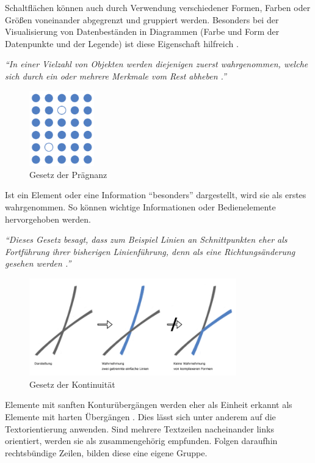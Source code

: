 Schaltflächen können auch durch Verwendung verschiedener Formen, Farben oder Größen voneinander abgegrenzt und gruppiert werden. Besonders bei der Visualisierung von Datenbeständen in Diagrammen (Farbe und Form der Datenpunkte und der Legende) ist diese Eigenschaft hilfreich \cite[S. 187]{Moser2012}.\par
{}
\textit{\enquote{In einer Vielzahl von Objekten werden diejenigen zuerst wahrgenommen, welche sich durch ein oder mehrere Merkmale vom Rest abheben \cite[S. 187]{Moser2012}.}}\par
\begin{figure}[H]
 \centering
 \includegraphics[width=0.25\textwidth]{grafiken/praegnanz.png}
 \caption{Gesetz der Prägnanz}
 \label{fig:gesetzPraeg}
\end{figure}
Ist ein Element oder eine Information \enquote{besonders} dargestellt, wird sie als erstes wahrgenommen. So können wichtige Informationen oder Bedienelemente hervorgehoben werden.\par
{}
\textit{\enquote{Dieses Gesetz besagt, dass zum Beispiel Linien an Schnittpunkten eher als Fortführung ihrer bisherigen Linienführung, denn als eine Richtungsänderung gesehen werden \cite{Grigo}.}}\par
\begin{figure}[H]
 \centering
 \includegraphics[width=0.8\textwidth]{grafiken/kontinuitaet.png}
 \caption[Gesetz der Kontinuität]{Gesetz der Kontinuität \cite{Grigo}}
 \label{fig:gesetzKonti}
\end{figure}
Elemente mit sanften Konturübergängen werden eher als Einheit erkannt als Elemente mit harten Übergängen \cite{Moser2012}.  Dies lässt sich unter anderem auf die Textorientierung anwenden. Sind mehrere Textzeilen nacheinander links orientiert, werden sie als zusammengehörig empfunden. Folgen daraufhin rechtsbündige Zeilen, bilden diese eine eigene Gruppe.\par
